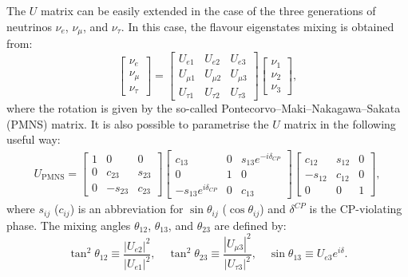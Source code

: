 The $U$ matrix can be easily extended in the case of the three generations of neutrinos $\nu_{e}$, $\nu_{\mu}$, and $\nu_{\tau}$. In this case, the flavour eigenstates mixing is obtained from:
\begin{equation}
\begin{bmatrix}
\nu_{e}\\
\nu_{\mu}\\
\nu_{\tau}
\end{bmatrix}=
\begin{bmatrix} U_{e 1} & U_{e 2} & U_{e 3} \\ U_{\mu 1} & U_{\mu 2} & U_{\mu 3} \\ U_{\tau 1} & U_{\tau 2} & U_{\tau 3} 
\end{bmatrix} 
\begin{bmatrix} \nu_1 \\ \nu_2 \\ \nu_3 \end{bmatrix},
\end{equation}
where the rotation is given by the so-called Pontecorvo–Maki–Nakagawa–Sakata (PMNS) matrix. It is also possible to parametrise the $U$ matrix in the following useful way:
\begin{align} 
  U_{\mathrm{PMNS}} = \begin{bmatrix} 1 & 0 & 0 \\ 0 & c_{23} & s_{23} \\ 0 & -s_{23} & c_{23} \end{bmatrix}
 \begin{bmatrix} c_{13} & 0 & s_{13}e^{-i\delta_{CP}} \\ 0 & 1 & 0 \\ -s_{13}e^{i\delta_{CP}} & 0 & c_{13} \end{bmatrix}
 \begin{bmatrix} c_{12} & s_{12} & 0 \\ -s_{12} & c_{12} & 0 \\ 0 & 0 & 1 \end{bmatrix},\label{eq:pmns}
\end{align}
where  $s_{ij}$ ($c_{ij}$) is an abbreviation for $\sin\theta_{ij}$ ($\cos\theta_{ij}$) and $\delta^{CP}$ is the CP-violating phase. The mixing angles $\theta_{12}$, $\theta_{13}$, and $\theta_{23}$ are defined by:
\begin{equation}
    \tan^2\theta_{12}\equiv\frac{|U_{e2}|^2}{|U_{e1}|^2},\quad
    \tan^2\theta_{23}\equiv\frac{|U_{\mu3}|^2}{|U_{\tau3}|^2},\quad
    \sin\theta_{13}\equiv U_{e3}e^{i\delta}.
\end{equation}

